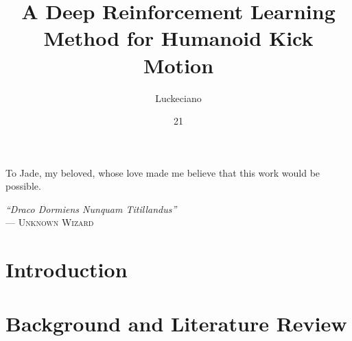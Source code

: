 \documentclass[tg, eng]{ita}    %
\author{Luckeciano}{Carvalho Melo}
\title{A Deep Reinforcement Learning Method for Humanoid Kick Motion}
\date{21}{NOVEMBER}{2018}
\begin{document}
\maketitle
%
%
\begin{itadedication}
To Jade, my beloved, whose love made me believe that this work would be possible.
\end{itadedication}

\begin{itathanks}

\end{itathanks}

\thispagestyle{empty}
\ifhyperref{}\fi
\begin{flushright}
\begin{spacing}{1}
\mbox{}\vfill
{\sffamily\itshape
``Draco Dormiens Nunquam Titillandus''\\}
--- \textsc{Unknown Wizard}
\end{spacing}
\end{flushright}

\begin{abstract}
\noindent

\end{abstract}

\begin{englishabstract}
\noindent

\end{englishabstract}

\listoffigures %

\listoftables %

\listofabbreviations

\listofsymbols

\tableofcontents

\mainmatter

\chapter{Introduction}\label{ch:intro}


\chapter{Background and Literature Review}\label{ch:soccer3d}

\end{document}
